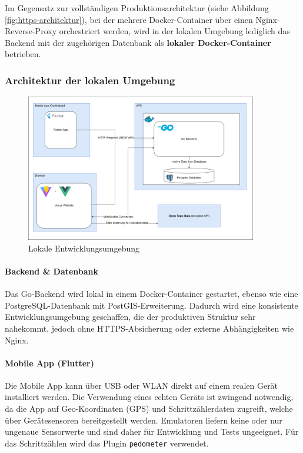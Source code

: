 \documentclass[11pt,a4paper]{article}
\begin{document}
Im Gegensatz zur vollständigen Produktionsarchitektur (siehe Abbildung \ref{fig:https-architektur}), bei der mehrere Docker-Container über einen Nginx-Reverse-Proxy orchestriert werden, wird in der lokalen Umgebung lediglich das Backend mit der zugehörigen Datenbank als \textbf{lokaler Docker-Container} betrieben.

\subsubsection{Architektur der lokalen Umgebung}
\begin{figure}[H]
    \centering
    \includegraphics[width=0.9\textwidth]{images/Architecture.png}
    \caption{Lokale Entwicklungsumgebung}
    \label{fig:local-architektur}
\end{figure}

\paragraph{Backend \& Datenbank}
Das Go-Backend wird lokal in einem Docker-Container gestartet, ebenso wie eine PostgreSQL-Datenbank mit PostGIS-Erweiterung. Dadurch wird eine konsistente Entwicklungsumgebung geschaffen, die der produktiven Struktur sehr nahekommt, jedoch ohne HTTPS-Absicherung oder externe Abhängigkeiten wie Nginx.

\paragraph{Mobile App (Flutter)}
Die Mobile App kann über USB oder WLAN direkt auf einem realen Gerät installiert werden. Die Verwendung eines echten Geräts ist zwingend notwendig, da die App auf Geo-Koordinaten (GPS) und Schrittzählerdaten zugreift, welche über Gerätesensoren bereitgestellt werden. Emulatoren liefern keine oder nur ungenaue Sensorwerte und sind daher für Entwicklung und Tests ungeeignet. Für das Schrittzählen wird das Plugin \texttt{pedometer}\cite{pedometer} verwendet.
\end{document}
